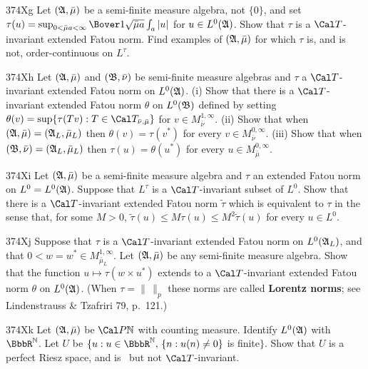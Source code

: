 {\sqheader 374Xg Let $(\frak A,\bar\mu)$ be a semi-finite measure
algebra, not $\{0\}$, and set
$\tau(u)=\sup_{0<\bar\mu a<\infty}\Bover1{\sqrt{\bar\mu a}}\int_a|u|$ for
$u\in L^0(\frak A)$.
Show that $\tau$ is a $\Cal T$-invariant extended Fatou norm.   Find
examples of
$(\frak A,\bar\mu)$ for which $\tau$ is, and is not, order-continuous on
$L^{\tau}$.

\spheader 374Xh Let $(\frak A,\bar\mu)$ and $(\frak B,\bar\nu)$ be
semi-finite measure algebras and $\tau$ a $\Cal T$-invariant extended
Fatou norm on $L^0(\frak A)$.   (i) Show that there is a
$\Cal T$-invariant extended Fatou norm $\theta$ on $L^0(\frak B)$
defined by setting
$\theta(v)=\sup\{\tau(Tv):T\in\Cal T_{\bar\nu,\bar\mu}\}$ for
$v\in M^{1,\infty}_{\bar\nu}$.    (ii) Show that when
$(\frak A,\bar\mu)=(\frak A_L,\bar\mu_L)$ then $\theta(v)=\tau(v^*)$ for
every $v\in M^{0,\infty}_{\bar\nu}$.   (iii) Show that when
$(\frak B,\bar\nu)=(\frak A_L,\bar\mu_L)$ then $\tau(u)=\theta(u^*)$ for
every $u\in M^{0,\infty}_{\bar\mu}$.

\spheader 374Xi Let $(\frak A,\bar\mu)$ be a semi-finite measure algebra
and $\tau$ an extended Fatou norm on $L^0=L^0(\frak A)$.   Suppose that
$L^{\tau}$ is a $\Cal T$-invariant subset of $L^0$.
Show that there is a $\Cal T$-invariant extended Fatou norm $\tilde\tau$
which is equivalent to $\tau$ in the sense that, for some $M>0$,
$\tilde\tau(u)\le M\tau(u)\le M^2\tilde\tau(u)$ for every $u\in L^0$.

\spheader 374Xj Suppose that $\tau$ is a $\Cal T$-invariant extended
Fatou norm on $L^0(\frak A_L)$, and that $0<w=w^*\in
M^{1,\infty}_{\bar\mu_L}$.   Let $(\frak A,\bar\mu)$ be any semi-finite
measure algebra.   Show that the function $u\mapsto\tau(w\times u^*)$
extends to a $\Cal T$-invariant extended Fatou norm $\theta$ on
$L^0(\frak A)$.      (When
$\tau=\|\,\|_p$ these norms are called {\bf Lorentz norms};  see {\smc
Lindenstrauss \& Tzafriri 79}, p.\ 121.)

\spheader 374Xk  Let $(\frak A,\bar\mu)$ be $\Cal P\Bbb N$ with counting
measure.   Identify $L^0(\frak A)$ with $\BbbR^{\Bbb N}$.
Let $U$ be $\{u:u\in\BbbR^{\Bbb N},\,\{n:u(n)\ne 0\}$ is finite$\}$.
Show that $U$ is a perfect Riesz space, and is \ri\ but not
$\Cal T$-invariant.

}
